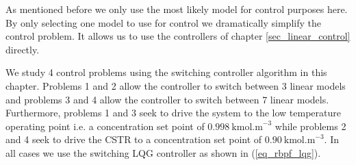 As mentioned before we only use the most likely model for control purposes here. By only selecting one model to use for control we dramatically simplify the control problem. It allows us to use the controllers of chapter \ref{sec_linear_control} directly. 

We study 4 control problems using the switching controller algorithm in this chapter. Problems 1 and 2 allow the controller to switch between 3 linear models and problems 3 and 4 allow the controller to switch between 7 linear models. Furthermore, problems 1 and 3 seek to drive the system to the low temperature operating point i.e. a concentration set point of $0.998~\text{kmol.m}^{-3}$ while problems 2 and 4 seek to drive the CSTR to a concentration set point of $0.90~\text{kmol.m}^{-3}$. In all cases we use the switching LQG controller as shown in (\ref{eq_rbpf_lqg}).

